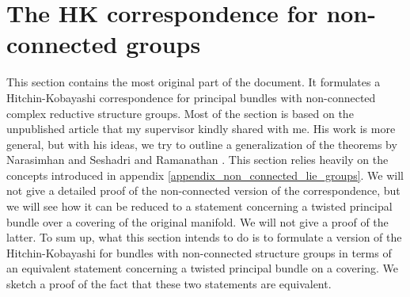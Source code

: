 \section{The HK correspondence for non-connected groups}
This section contains the most original part of the document. It formulates a Hitchin-Kobayashi correspondence for principal bundles with non-connected complex reductive structure groups. Most of the section is based on the unpublished article \parencite{HKnonconnected} that my supervisor kindly shared with me. His work is more general, but with his ideas, we try to outline a generalization of the theorems by Narasimhan and Seshadri \parencite{NS1965} and Ramanathan \parencite{Ramanathan1996}. This section relies heavily on the concepts introduced in appendix \ref{appendix_non_connected_lie_groups}. We will not give a detailed proof of the non-connected version of the correspondence, but we will see how it can be reduced to a statement concerning a twisted principal bundle over a covering of the original manifold. We will not give a proof of the latter. To sum up, what this section intends to do is to formulate a version of the Hitchin-Kobayashi for bundles with non-connected structure groups in terms of an equivalent statement concerning a twisted principal bundle on a covering. We sketch a proof of the fact that these two statements are equivalent. 


